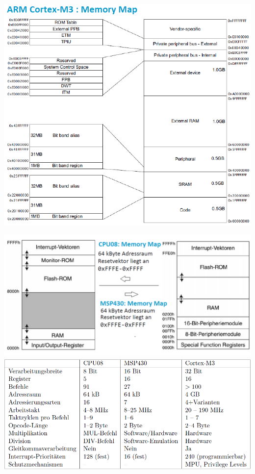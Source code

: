 \begin{minipage}{0.48\textwidth}
\flushleft{}
    \includegraphics[width = 1\linewidth]{images/Plattformen/Cortex_M3_MMap}
\end{minipage}
\begin{minipage}{0.52\textwidth}
\flushright
    \includegraphics[width = 0.9\linewidth]{images/Plattformen/CPU08_MSP_MMap}
	\includegraphics[width = 0.9\linewidth]{images/Plattformen/VergleichBSPArchitektur}
\end{minipage}
